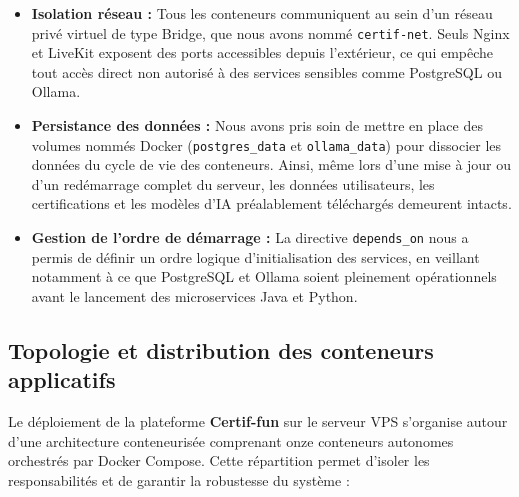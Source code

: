 \begin{itemize}
    \item \textbf{Isolation réseau :} Tous les conteneurs communiquent au sein d'un réseau privé virtuel de type Bridge, que nous avons nommé \texttt{certif-net}. Seuls Nginx et LiveKit exposent des ports accessibles depuis l'extérieur, ce qui empêche tout accès direct non autorisé à des services sensibles comme PostgreSQL ou Ollama.
    \item \textbf{Persistance des données :} Nous avons pris soin de mettre en place des volumes nommés Docker (\texttt{postgres\_data} et \texttt{ollama\_data}) pour dissocier les données du cycle de vie des conteneurs. Ainsi, même lors d'une mise à jour ou d'un redémarrage complet du serveur, les données utilisateurs, les certifications et les modèles d'IA préalablement téléchargés demeurent intacts.
    \item \textbf{Gestion de l'ordre de démarrage :} La directive \texttt{depends\_on} nous a permis de définir un ordre logique d'initialisation des services, en veillant notamment à ce que PostgreSQL et Ollama soient pleinement opérationnels avant le lancement des microservices Java et Python.
\end{itemize}

\subsection{Topologie et distribution des conteneurs applicatifs}
Le déploiement de la plateforme \textbf{Certif-fun} sur le serveur VPS s'organise autour d'une architecture conteneurisée comprenant onze conteneurs autonomes orchestrés par Docker Compose. Cette répartition permet d'isoler les responsabilités et de garantir la robustesse du système :


